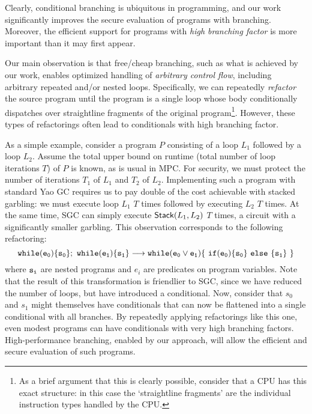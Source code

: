 Clearly, conditional branching is ubiquitous in programming, and our work significantly
improves the secure evaluation of programs with
branching.
Moreover, the efficient support for programs with \emph{high branching factor}
is more important than it may first appear.

Our main observation is that free/cheap branching, such as what is
achieved by our work, enables optimized handling of \emph{arbitrary
control flow}, including arbitrary repeated and/or nested loops.
%
Specifically, we can repeatedly \emph{refactor} the source program
until the program is a single loop whose body conditionally dispatches
over straightline fragments of the original program\footnote{%
  As a brief argument that this is clearly possible, consider that a
  CPU has this exact structure: in this case the `straightline
  fragments' are the individual instruction types handled by the CPU.
}.
However, these types of refactorings often lead to conditionals with
high branching factor.

As a simple example,
consider a program $P$ consisting of a loop $L_1$ followed by a loop
$L_2$.  Assume the total upper bound on runtime (total number of loop
iterations $T$) of $P$ is known, as is usual in MPC.
For security, we must protect the number of iterations $T_1$ of $L_1$
and $T_2$ of $L_2$.
Implementing such a program with standard Yao GC requires us to
pay double of the cost achievable with stacked garbling: we must
execute loop $L_1$ $T$ times followed by executing $L_2$ $T$ times.
At the same time, SGC can simply execute  $\textsf{Stack}(L_1, L_2)$ $T$
times, a circuit with a significantly smaller garbling. This observation corresponds to the
following refactoring:
\[{\tt while (e_0) \{ s_0 \} ; \ while (e_1) \{ s_1 \}}
\longrightarrow {\tt while (e_0 \lor e_1) \{\ if  (e_0) \{s_0\}\  else\  \{s_1\}\ \}} \]
where ${\tt s_i}$ are nested programs and $e_i$ are predicates on program
variables.
Note that the result of this transformation is friendlier to SGC, 
 since we have reduced the number of loops,
but have introduced a conditional.
Now, consider that $s_0$ and $s_1$ might themselves have conditionals
that can now be flattened into a single conditional with all branches.
By repeatedly applying refactorings like this one, even modest
programs can have conditionals with very high branching factors.
High-performance branching, enabled by our approach, will allow the
efficient and secure evaluation of such programs.


